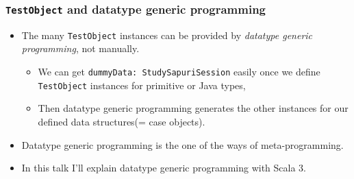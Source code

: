 \begin{frame}
  \frametitle{\lstinline|TestObject| and datatype generic programming}

  \pause
  \begin{itemize}
    \item<+-> The many \lstinline|TestObject| instances can be provided by
    \emph{datatype generic programming}, not manually.
    \begin{itemize}
      \item We can get \lstinline|dummyData: StudySapuriSession| easily once we define
      \lstinline|TestObject| instances for primitive or Java types,
      \item Then datatype generic programming generates the other instances for our
      defined data structures(= case objects).
    \end{itemize}

    \item<+-> Datatype generic programming is the one of the ways of meta-programming.

    \item<+-> In this talk I'll explain datatype generic programming with Scala 3.
  \end{itemize}

\end{frame}

